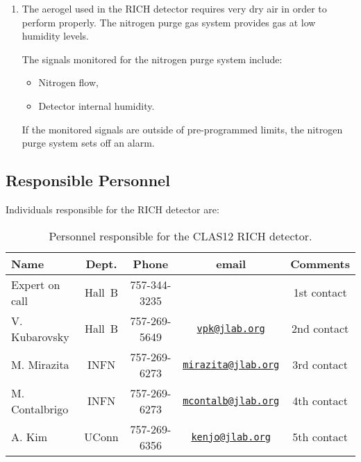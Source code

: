 \begin{enumerate}
\item The aerogel used in the RICH detector requires very dry air in order to perform properly. The 
nitrogen purge gas system provides gas  at low humidity levels.

The signals monitored for the nitrogen purge system include:
\begin{itemize}
\item Nitrogen flow,
\item Detector internal humidity.
\end{itemize}
If the monitored signals are outside of pre-programmed limits, the nitrogen purge system sets off 
an alarm.
\end{enumerate}

\subsection{Responsible Personnel}

Individuals responsible for the RICH detector are:

\begin{table}[!htb]
\centering
\begin{tabular}{|l|c|c|c|c|} \hline
Name&Dept.&Phone&email&Comments \\ \hline
Expert on call & Hall~B & 757-344-3235 & & 1st contact \\ \hline
V. Kubarovsky  & Hall~B & 757-269-5649&\href{mailto:vpk@jlab.org}{\nolinkurl{vpk@jlab.org}}&2nd contact \\ \hline
M. Mirazita    & INFN   & 757-269-6273&\href{mailto:mirazita@jlab.org}{\nolinkurl{mirazita@jlab.org}}& 3rd contact \\ \hline
M. Contalbrigo & INFN   & 757-269-6273&\href{mailto:mcontalb@jlab.org}{\nolinkurl{mcontalb@jlab.org}}& 4th contact \\ \hline
A. Kim         & UConn  & 757-269-6356&\href{mailto:kenjo@jlab.org}{\nolinkurl{kenjo@jlab.org}}& 5th contact \\ \hline
 \end{tabular}
\caption{Personnel responsible for the CLAS12 RICH detector.} 
\label{tb:rich}
\end{table}

